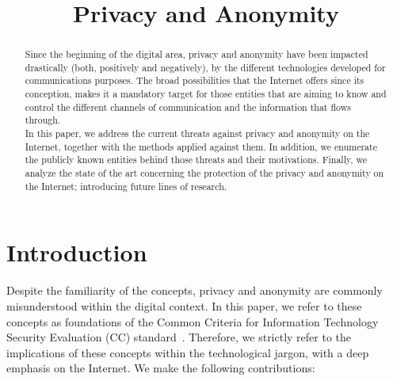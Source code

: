 \documentclass[conference]{IEEEtran}
\begin{document}
\title{Privacy and Anonymity}

\author{
}













\maketitle
\thispagestyle{plain}
\pagestyle{plain}
\begin{abstract}

Since the beginning of the digital area, privacy and anonymity have been
impacted drastically (both, positively and negatively), by the different
technologies developed for communications purposes. The broad
possibilities that the Internet offers since its conception, makes it a
mandatory target for those entities that are aiming to know and control
the different channels of communication and the information that flows
through. \\
In this paper, we address the current threats against privacy and
anonymity on the Internet, together with the methods applied against them. 
In addition, we enumerate the publicly known entities behind those threats and their
motivations. Finally, we analyze the state of the art concerning the
protection of the privacy and anonymity on the Internet; introducing future lines of research.
\end{abstract}







\IEEEpeerreviewmaketitle



\section{Introduction}

Despite the familiarity of the concepts, privacy and anonymity are
commonly misunderstood within the digital context. In this paper, we
refer to these concepts as foundations of the Common Criteria for
Information Technology Security Evaluation (CC)
standard~\cite{iso15408}. Therefore, we strictly refer to the
implications of these concepts within the technological jargon, with a
deep emphasis on the Internet. We make the following contributions:
\end{document}
